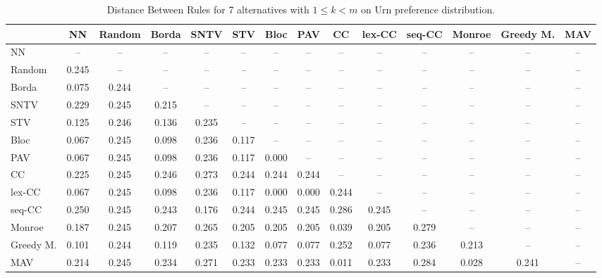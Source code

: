 
\begin{table*}
\centering
\begin{tabular}{lccccccccccccc}
\toprule
 & NN & Random & Borda & SNTV & STV & Bloc & PAV & CC & lex-CC & seq-CC & Monroe & Greedy M. & MAV \\
\midrule
NN & -- & -- & -- & -- & -- & -- & -- & -- & -- & -- & -- & -- & -- \\
Random & 0.245 & -- & -- & -- & -- & -- & -- & -- & -- & -- & -- & -- & -- \\
Borda & 0.075 & 0.244 & -- & -- & -- & -- & -- & -- & -- & -- & -- & -- & -- \\
SNTV & 0.229 & 0.245 & 0.215 & -- & -- & -- & -- & -- & -- & -- & -- & -- & -- \\
STV & 0.125 & 0.246 & 0.136 & 0.235 & -- & -- & -- & -- & -- & -- & -- & -- & -- \\
Bloc & 0.067 & 0.245 & 0.098 & 0.236 & 0.117 & -- & -- & -- & -- & -- & -- & -- & -- \\
PAV & 0.067 & 0.245 & 0.098 & 0.236 & 0.117 & 0.000 & -- & -- & -- & -- & -- & -- & -- \\
CC & 0.225 & 0.245 & 0.246 & 0.273 & 0.244 & 0.244 & 0.244 & -- & -- & -- & -- & -- & -- \\
lex-CC & 0.067 & 0.245 & 0.098 & 0.236 & 0.117 & 0.000 & 0.000 & 0.244 & -- & -- & -- & -- & -- \\
seq-CC & 0.250 & 0.245 & 0.243 & 0.176 & 0.244 & 0.245 & 0.245 & 0.286 & 0.245 & -- & -- & -- & -- \\
Monroe & 0.187 & 0.245 & 0.207 & 0.265 & 0.205 & 0.205 & 0.205 & 0.039 & 0.205 & 0.279 & -- & -- & -- \\
Greedy M. & 0.101 & 0.244 & 0.119 & 0.235 & 0.132 & 0.077 & 0.077 & 0.252 & 0.077 & 0.236 & 0.213 & -- & -- \\
MAV & 0.214 & 0.245 & 0.234 & 0.271 & 0.233 & 0.233 & 0.233 & 0.011 & 0.233 & 0.284 & 0.028 & 0.241 & -- \\
\bottomrule
\end{tabular}

\caption{Distance Between Rules for 7 alternatives with $1 \leq k < m$ on Urn preference distribution.}
\end{table*}
